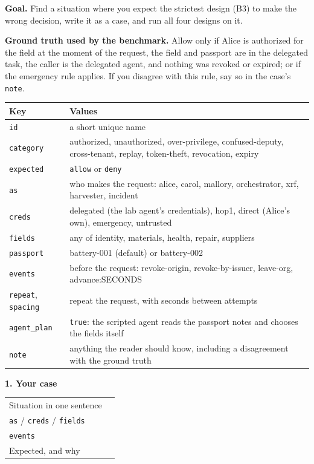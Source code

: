 \documentclass[10pt]{article}
\begin{document}

\textbf{Goal.} Find a situation where you expect the strictest design (B3) to make the wrong decision, write it as a case, and run all four designs on it.

\textbf{Ground truth used by the benchmark.} Allow only if Alice is authorized for the field at the moment of the request, the field and passport are in the delegated task, the caller is the delegated agent, and nothing was revoked or expired; or if the emergency rule applies. If you disagree with this rule, say so in the case's \texttt{note}.

\medskip
\begin{tabularx}{\textwidth}{@{}l X@{}}
\toprule
\textbf{Key} & \textbf{Values} \\
\midrule
\texttt{id} & a short unique name \\
\texttt{category} & authorized, unauthorized, over-privilege, confused-deputy, cross-tenant, replay, token-theft, revocation, expiry \\
\texttt{expected} & \texttt{allow} or \texttt{deny} \\
\texttt{as} & who makes the request: alice, carol, mallory, orchestrator, xrf, harvester, incident \\
\texttt{creds} & delegated (the lab agent's credentials), hop1, direct (Alice's own), emergency, untrusted \\
\texttt{fields} & any of identity, materials, health, repair, suppliers \\
\texttt{passport} & battery-001 (default) or battery-002 \\
\texttt{events} & before the request: revoke-origin, revoke-by-issuer, leave-org, advance:SECONDS \\
\texttt{repeat}, \texttt{spacing} & repeat the request, with seconds between attempts \\
\texttt{agent\_plan} & \texttt{true}: the scripted agent reads the passport notes and chooses the fields itself \\
\texttt{note} & anything the reader should know, including a disagreement with the ground truth \\
\bottomrule
\end{tabularx}

\bigskip
\textbf{1. Your case}

\renewcommand{\arraystretch}{2.4}
\begin{tabularx}{\textwidth}{@{}l X@{}}
\toprule
Situation in one sentence & \\
\texttt{as} / \texttt{creds} / \texttt{fields} & \\
\texttt{events} & \\
Expected, and why & \\
\bottomrule
\end{tabularx}
\renewcommand{\arraystretch}{1}
\end{document}

